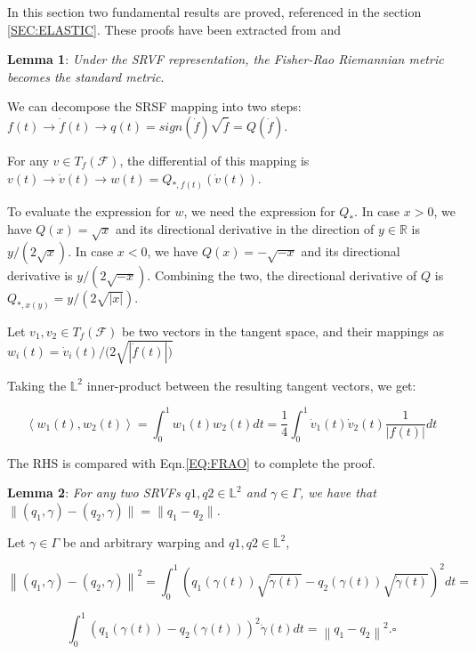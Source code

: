 

In this section two fundamental results are proved, referenced in the section
 \ref{SEC:ELASTIC}. These proofs have been extracted from
 \cite{Srivastava2016} and \cite{Srivastava2011}

\textbf{Lemma 1}: \textit{Under the SRVF representation, the Fisher-Rao Riemannian metric
becomes the standard metric}.

We can decompose the SRSF mapping into two steps:
$f(t) \rightarrow \dot f(t) \rightarrow q(t)=sign(\dot f) \sqrt{\dot f}=Q(\dot f)$.

For any $v \in T_f(\mathcal{F})$, the differential of this mapping is
$v(t) \rightarrow \dot v(t) \rightarrow w(t) = Q_{*, f(t)}(\dot v(t))$.

To evaluate the expression for $w$, we need the expression for $Q_{*}$.
In case $x > 0$, we have $Q(x) = \sqrt{x}$ and its directional derivative in the
direction of $y \in \mathbb{R}$ is $y/(2\sqrt{x})$.
In case $x <0$, we have $Q(x) = - \sqrt{-x}$ and its directional derivative is
$y/(2\sqrt{-x})$. Combining the two, the directional
derivative of $Q$ is $Q_{*,x(y)} = y/(2 \sqrt{|x|})$.

Let $v_1, v_2 \in T_f(\mathcal{F})$ be two vectors in the tangent space, and their
mappings as $w_{i}(t) = \dot{v}_{i}(t) /(2 \sqrt{|\dot{f}(t)| )}$

Taking the $\mathbb{L}^2$ inner-product between the resulting tangent vectors, we get:

$$
\left\langle w_{1}(t), w_{2}(t)\right\rangle=\int_{0}^{1} w_{1}(t) w_{2}(t) d t=\frac{1}{4} \int_{0}^{1} \dot{v}_{1}(t) \dot{v}_{2}(t) \frac{1}{|f(t)|} d t
$$


The RHS is compared with Eqn.\ref{EQ:FRAO} to complete the proof.


\textbf{Lemma 2}: \textit{For any two SRVFs $q1, q2 \in \mathbb{L}^2$ and $\gamma \in
\Gamma$, we have that $\|(q_1, \gamma) - (q_2, \gamma)\| = \| q_1 - q_2\|$.}

Let $\gamma \in \Gamma$ be and arbitrary warping and $q1, q2 \in \mathbb{L}^2$,

$$
\left\|\left(q_{1}, \gamma\right)-\left(q_{2}, \gamma\right)\right\|^{2}=
\int_{0}^{1}\left(q_{1}(\gamma(t)) \sqrt{\dot{\gamma}(t)}-q_{2}(\gamma(t))
\sqrt{\dot{\gamma}(t)}\right)^{2} d t=
$$

$$
\int_{0}^{1}\left(q_{1}(\gamma(t))-q_{2}
(\gamma(t))\right)^{2} \dot{\gamma}(t) d t=\left\|q_{1}-q_{2}\right\|^{2} . \square
$$
